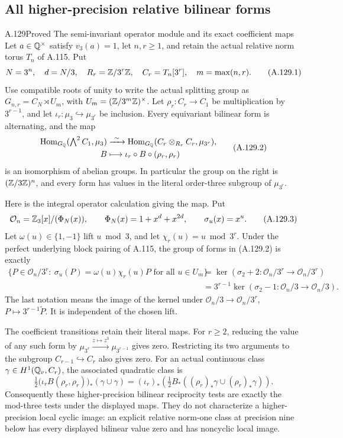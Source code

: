 \subsection{All higher-precision relative bilinear forms}

\begin{statement}{A.129}{Proved}
{The semi-invariant operator module and its exact coefficient maps}
Let \(a\in\mathbb Q^\times\) satisfy \(v_3(a)=1\), let \(n,r\ge1\),
and retain the actual relative norm torus \(T_n\) of A.115.
Put
\[
 N=3^n,\quad d=N/3,\quad R_r=\mathbb Z/3^r\mathbb Z,\quad
 C_r=T_n[3^r],\quad m=\max(n,r).
 \tag{A.129.1}
\]
Use compatible roots of unity to write the actual splitting group as
\(G_{n,r}=C_N\rtimes U_m\), with
\(U_m=(\mathbb Z/3^m\mathbb Z)^\times\).
Let \(\rho_r:C_r\to C_1\) be multiplication by \(3^{r-1}\),
and let \(\iota_r:\mu_3\hookrightarrow\mu_{3^r}\) be inclusion.
Every equivariant bilinear form is alternating, and the map
\[
 \begin{split}
 \operatorname{Hom}_{G_\mathbb Q}(\textstyle\bigwedge^2 C_1,\mu_3)
 &\xrightarrow{\ \sim\ }
       \operatorname{Hom}_{G_\mathbb Q}(C_r\otimes_{R_r}C_r,\mu_{3^r}),\\
 B&\longmapsto\iota_r\circ B\circ(\rho_r,\rho_r)
 \end{split}
 \tag{A.129.2}
\]
is an isomorphism of abelian groups.  In particular the group on the
right is \((\mathbb Z/3\mathbb Z)^n\), and every form has values in the literal
order-three subgroup of \(\mu_{3^r}\).

Here is the integral operator calculation giving the map.
Put
\[
 \mathcal O_n=\mathbb Z_3[x]/(\Phi_N(x)),\qquad
 \Phi_N(x)=1+x^d+x^{2d},\qquad
 \sigma_u(x)=x^u.
 \tag{A.129.3}
\]
Let \(\omega(u)\in\{1,-1\}\) lift \(u\bmod3\), and let
\(\chi_r(u)=u\bmod3^r\).
Under the perfect underlying block pairing of A.115, the group
of forms in (A.129.2) is exactly
\[
 \begin{split}
 \{P\in\mathcal O_n/3^r:\ 
        \sigma_u(P)=\omega(u)\chi_r(u)P\text{ for all }u\in U_m\}
 &=\ker(\sigma_2+2:\mathcal O_n/3^r\to\mathcal O_n/3^r)\\
 &=3^{r-1}\ker(\sigma_2-1:\mathcal O_n/3\to\mathcal O_n/3).
 \end{split}
 \tag{A.129.4}
\]
The last notation means the image of the kernel under
\(\mathcal O_n/3\to\mathcal O_n/3^r\), \(P\mapsto3^{r-1}\widetilde P\).
It is independent of the chosen lift.

The coefficient transitions retain their literal maps.
For \(r\ge2\), reducing the value of any such form by
\(\mu_{3^r}\xrightarrow{z\mapsto z^3}\mu_{3^{r-1}}\)
gives zero.  Restricting its two arguments to the subgroup
\(C_{r-1}\hookrightarrow C_r\) also gives zero.
For an actual continuous class \(\gamma\in H^1(\mathbb Q_v,C_r)\),
the associated quadratic class is
\[
 \tfrac12\bigl(\iota_r B(\rho_r,\rho_r)\bigr)_*
                         (\gamma\cup\gamma)
  =(\iota_r)_*\!\left(
       \tfrac12 B_*((\rho_r)_*\gamma\cup(\rho_r)_*\gamma)\right).
 \tag{A.129.5}
\]
Consequently these higher-precision bilinear reciprocity tests
are exactly the mod-three tests under the displayed maps.
They do not characterize a higher-precision local cyclic image:
an explicit relative norm-one class at precision nine below
has every displayed bilinear value zero and has noncyclic
local image.
\end{statement}
